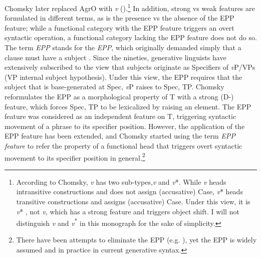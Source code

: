 Chomsky later replaced AgrO with \textit{v} (\citeyear{Chomsky1995,Chomsky1998}).\footnote{\label{fn:30}According to Chomsky, \textit{v} has two sub-types,\textit{v}  and \textit{v}*. While \textit{v} heads intransitive constructions and does not assign (accusative) Case, \textit{v}* \textrm{heads transitive constructions and assigns (accusative) Case. Under this view, it is} \textit{v}* \textrm{, not} \textrm{\textit{v}}\textrm{, which has a strong feature and triggers object shift. I will not distinguish} \textrm{\textit{v}} \textrm{and} \textrm{\textit{v}}\textrm{\textsuperscript{*}} \textrm{in this monograph for the sake of simplicity.}} In addition, strong vs weak features are formulated in different terms, as is the presence vs the absence of the \ac{EPP} feature; while a functional category with the \ac{EPP} feature triggers an overt syntactic operation, a functional category lacking the \ac{EPP} feature does not do so. The term \textit{\ac{EPP}} stands for the \textit{\acl{EPP}}, which originally demanded simply that a clause must have a subject \citep{Chomsky1982}. Since the nineties, generative linguists have extensively subscribed to the view that subjects originate as Specifiers of \textit{v}P/\acp{VP} (\ac{VP} internal subject hypothesis). Under this view, the \ac{EPP} requires that the subject that is base-generated at Spec, \textit{v}P raises to Spec, \ac{TP}. Chomsky reformulates the \ac{EPP} as a morphological property of T with a  strong (D-) feature, which forces Spec, \ac{TP} to be lexicalized by raising an element. The \ac{EPP} feature was considered as an independent feature on T, triggering syntactic movement of a phrase to its specifier position. However, the application of the \ac{EPP} feature has been extended, and Chomsky started using the term \textit{\ac{EPP} feature} to refer the property of a functional head that triggers overt syntactic movement to its specifier position in general.\footnote{There have been attempts to eliminate the \ac{EPP} (e.g. \citealt{Boskovic2002,GrohmannEtAl2000}), yet the \ac{EPP} is widely assumed and in practice in current generative syntax.}

